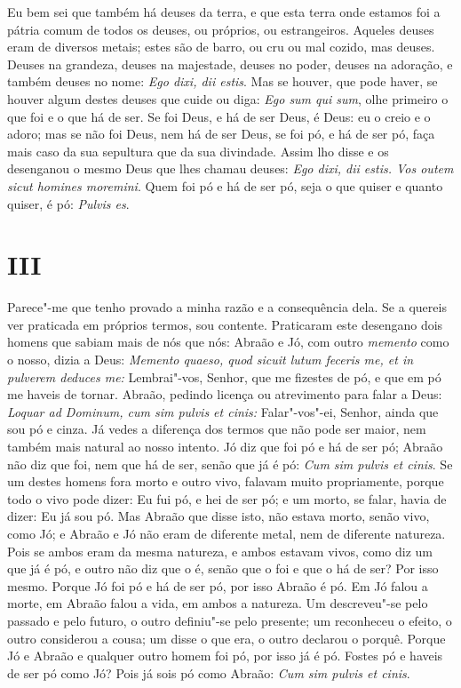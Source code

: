 Eu bem sei que também há deuses da terra, e que esta terra onde
estamos foi a pátria comum de todos os deuses, ou próprios, ou
estrangeiros. Aqueles deuses eram de diversos metais; estes são de
barro, ou cru ou mal cozido, mas deuses. Deuses na grandeza, deuses na
majestade, deuses no poder, deuses na adoração, e
também deuses no nome: \emph{Ego dixi, dii estis}. Mas se houver, que
pode haver, se houver algum destes deuses que cuide ou diga: \emph{Ego
sum qui sum}, olhe primeiro o que foi e o que há de ser. Se foi Deus, e
há de ser Deus, é Deus: eu o creio e o adoro; mas se não foi Deus, nem
há de ser Deus, se foi pó, e há de ser pó, faça mais caso da sua
sepultura que da sua divindade. Assim lho disse e os desenganou o mesmo
Deus que lhes chamau deuses: \emph{Ego dixi, dii estis. Vos outem sicut
homines moremini}. Quem foi pó e há de ser pó, seja o que quiser e
quanto quiser, é pó: \emph{Pulvis es}.

\section*{III}

Parece"-me que tenho provado a minha razão e a consequência dela. Se a
quereis ver praticada em próprios termos, sou contente. Praticaram este
desengano dois homens que sabiam mais de nós que nós: Abraão e Jó, com
outro \emph{memento} como o nosso, dizia a Deus: \emph{Memento quaeso,
quod sicuit lutum feceris me, et in pulverem deduces me:} Lembrai"-vos,
Senhor, que me fizestes de pó, e que em pó me haveis de tornar. %
Abraão, pedindo licença ou atrevimento para falar a Deus:
\emph{Loquar ad Dominum, cum sim pulvis et cinis:} Falar"-vos"-ei, Senhor,
ainda que sou pó e cinza. Já vedes a diferença dos %
termos que não pode ser maior, nem também mais natural ao nosso intento.
Jó diz que foi pó e há de ser pó; Abraão não diz que foi, nem que há de
ser, senão que já é pó: \emph{Cum sim pulvis et cinis}. Se um destes
homens fora morto e outro vivo, falavam muito propriamente, porque todo
o vivo pode dizer: Eu fui pó, e hei de ser pó; e um morto, se falar,
havia de dizer: Eu já sou pó. Mas Abraão que disse isto, não estava
morto, senão vivo, como Jó; e Abraão e Jó não eram de diferente metal,
nem de diferente natureza. Pois se ambos eram da mesma natureza, e ambos
estavam vivos, como diz um que já é pó, e outro não diz que o é, senão
que o foi e que o há de ser? Por isso mesmo. Porque Jó foi pó e há de
ser pó, por isso Abraão é pó. Em Jó falou a morte, em
Abraão falou a vida, em ambos a natureza. Um descreveu"-se pelo passado e
pelo futuro, o outro definiu"-se pelo presente; um reconheceu o efeito, o
outro considerou a cousa; um disse o que era, o outro declarou o porquê.
Porque Jó e Abraão e qualquer outro homem foi pó, por isso já é pó.
Fostes pó e haveis de ser pó como Jó? Pois já sois pó como Abraão:
\emph{Cum sim pulvis et cinis}.

